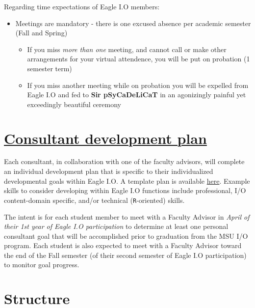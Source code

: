 \documentclass[
]{book}
\providecommand{\tightlist}{%
  \setlength{\itemsep}{0pt}\setlength{\parskip}{0pt}}
\begin{document}
Regarding time expectations of Eagle I.O members:

\begin{itemize}
\tightlist
\item
  Meetings are mandatory - there is one excused absence per academic semester (Fall and Spring)

  \begin{itemize}
  \tightlist
  \item
    If you miss \emph{more than one} meeting, and cannot call or make other arrangements for your virtual attendence, you will be put on probation (1 semester term)
  \item
    If you miss another meeting while on probation you will be expelled from Eagle I.O and fed to \textbf{Sir pSyCaDeLiCaT} in an agonizingly painful yet exceedingly beautiful ceremony
  \end{itemize}
\end{itemize}

\hypertarget{consultant-development-plan}{%
\section{\texorpdfstring{\href{https://docs.google.com/document/d/13OhBJgO4Lr40uA9s3tLBTm17TNRrQa-NJnfTIbSGmT4/edit?usp=sharing}{Consultant development plan}}{Consultant development plan}}\label{consultant-development-plan}}

Each consultant, in collaboration with one of the faculty advisors, will complete an individual development plan that is specific to their individualized developmental goals within Eagle I.O. A template plan is available \href{https://docs.google.com/document/d/13OhBJgO4Lr40uA9s3tLBTm17TNRrQa-NJnfTIbSGmT4/edit?usp=sharing}{here}. Example skills to consider developing within Eagle I.O functions include professional, I/O content-domain specific, and/or technical (\texttt{R}-oriented) skills.

The intent is for each student member to meet with a Faculty Advisor in \emph{April of their 1st year of Eagle I.O participation} to determine at least one personal consultant goal that will be accomplished prior to graduation from the MSU I/O program. Each student is also expected to meet with a Faculty Advisor toward the end of the Fall semester (of their second semester of Eagle I.O participation) to monitor goal progress.

\hypertarget{roles}{%
\section{Structure}\label{roles}}
\end{document}
